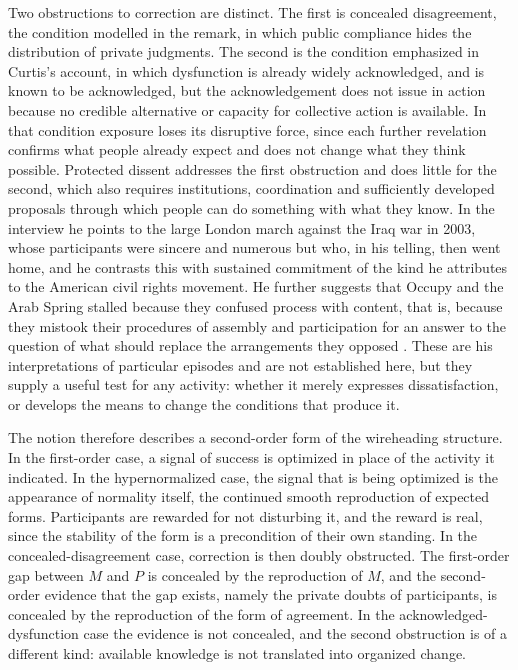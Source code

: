 \documentclass[11pt]{article}
\theoremstyle{definition}
\theoremstyle{remark}
\begin{document}
Two obstructions to correction are distinct. The first is concealed disagreement, the condition modelled in the remark, in which public compliance hides the distribution of private judgments. The second is the condition emphasized in Curtis's account, in which dysfunction is already widely acknowledged, and is known to be acknowledged, but the acknowledgement does not issue in action because no credible alternative or capacity for collective action is available. In that condition exposure loses its disruptive force, since each further revelation confirms what people already expect and does not change what they think possible. Protected dissent addresses the first obstruction and does little for the second, which also requires institutions, coordination and sufficiently developed proposals through which people can do something with what they know. In the interview he points to the large London march against the Iraq war in 2003, whose participants were sincere and numerous but who, in his telling, then went home, and he contrasts this with sustained commitment of the kind he attributes to the American civil rights movement. He further suggests that Occupy and the Arab Spring stalled because they confused process with content, that is, because they mistook their procedures of assembly and participation for an answer to the question of what should replace the arrangements they opposed \cite{brandcurtis2016}. These are his interpretations of particular episodes and are not established here, but they supply a useful test for any activity: whether it merely expresses dissatisfaction, or develops the means to change the conditions that produce it.

The notion therefore describes a second-order form of the wireheading structure. In the first-order case, a signal of success is optimized in place of the activity it indicated. In the hypernormalized case, the signal that is being optimized is the appearance of normality itself, the continued smooth reproduction of expected forms. Participants are rewarded for not disturbing it, and the reward is real, since the stability of the form is a precondition of their own standing. In the concealed-disagreement case, correction is then doubly obstructed. The first-order gap between $M$ and $P$ is concealed by the reproduction of $M$, and the second-order evidence that the gap exists, namely the private doubts of participants, is concealed by the reproduction of the form of agreement. In the acknowledged-dysfunction case the evidence is not concealed, and the second obstruction is of a different kind: available knowledge is not translated into organized change.
\end{document}
